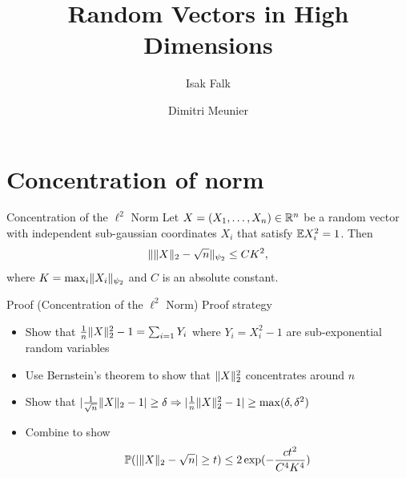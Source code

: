 \documentclass{beamer}
\title{Random Vectors in High Dimensions}
\author{Isak Falk \and Dimitri Meunier}
\institute{IIT}
\begin{document}
  \maketitle
  \section{Concentration of norm}
  \begin{frame}{Concentration of the \(\ell^{2}\) Norm}
      Let \(X = (X_{1}, \dots, X_{n}) \in \mathbb{R}^{n}\) be a random vector with independent
      sub-gaussian coordinates \(X_{i}\) that satisfy \(\mathbb{E} X_{i}^{2} = 1\). Then
      \begin{equation}
        \lVert\lVert X\rVert_{2} - \sqrt{n}\rVert_{\psi_{2}} \leq CK^{2},
      \end{equation}
      where \(K = \max_{i} \lVert X_{i}\rVert_{\psi_{2}}\) and \(C\) is an absolute
      constant.
  \end{frame}

  \begin{frame}{Proof (Concentration of the \(\ell^{2}\) Norm)}
    Proof strategy\pause
    \begin{itemize}
      \item Show that \(\frac{1}{n}\lVert X\rVert_{2}^{2} - 1 = \sum_{i=1}Y_{i} \)
        where \(Y_{i} = X_{i}^{2} - 1\) are sub-exponential random variables\pause
      \item Use Bernstein's theorem to show that \(\lVert X\rVert_{2}^{2}\)
        concentrates around \(n\)\pause
      \item Show that
        \(\lvert\frac{1}{\sqrt{n}}\lVert X\rVert_{2} - 1\rvert \geq \delta \Rightarrow \lvert\frac{1}{n}\lVert X\rVert_{2}^{2} - 1\rvert \geq \max(\delta, \delta^{2})\)\pause
      \item Combine to show
        \begin{equation}
          \mathbb{P}(\lvert\lVert X\rVert_{2} - \sqrt{n}\rvert \geq t) \leq 2 \exp(-\frac{ct^{2}}{C^{4}K^{4}})
        \end{equation}
    \end{itemize}
  \end{frame}
\end{document}
